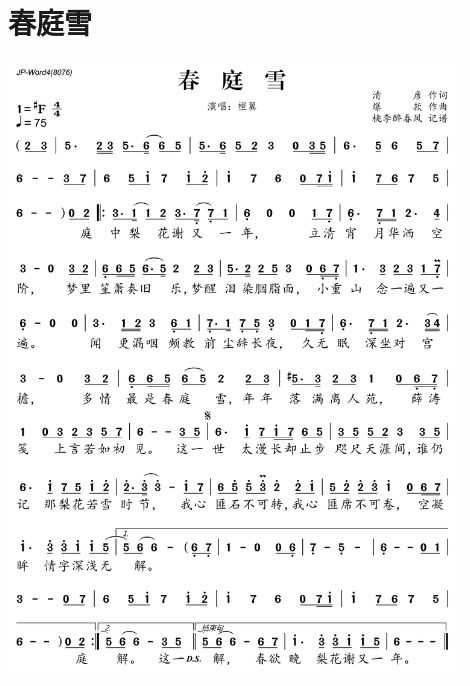 \documentclass[cn,pad,twocol]{elegantbook}
\begin{document}
\section{春庭雪}\includegraphics[width=0.9\textwidth]{rpi400/20210124-春庭雪.png}
\end{document}
